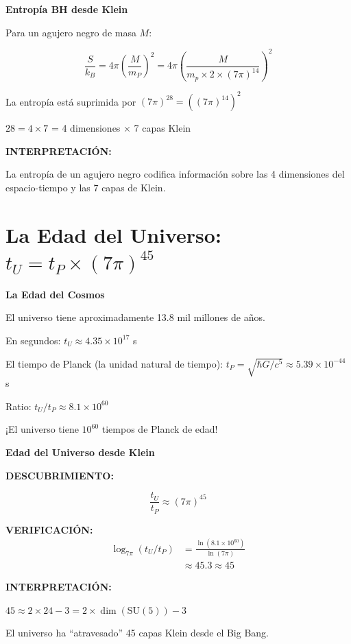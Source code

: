 \begin{nivelmatematico}
\textbf{Entropía BH desde Klein}

Para un agujero negro de masa $M$:

\begin{equation}
\frac{S}{k_B} = 4\pi \left(\frac{M}{m_P}\right)^2 = 4\pi \left(\frac{M}{m_p \times 2 \times (7\pi)^{14}}\right)^2
\end{equation}

La entropía está suprimida por $(7\pi)^{28} = ((7\pi)^{14})^2$

$28 = 4 \times 7$ = 4 dimensiones $\times$ 7 capas Klein

\textbf{INTERPRETACIÓN:}

La entropía de un agujero negro codifica información sobre
las 4 dimensiones del espacio-tiempo y las 7 capas de Klein.
\end{nivelmatematico}


\section{La Edad del Universo: $t_U = t_P \times (7\pi)^{45}$}

\begin{nivelconceptual}
\textbf{La Edad del Cosmos}

El universo tiene aproximadamente 13.8 mil millones de años.

En segundos: $t_U \approx 4.35 \times 10^{17}$ s

El tiempo de Planck (la unidad natural de tiempo):
$t_P = \sqrt{\hbar G/c^5} \approx 5.39 \times 10^{-44}$ s

Ratio: $t_U / t_P \approx 8.1 \times 10^{60}$

¡El universo tiene $10^{60}$ tiempos de Planck de edad!
\end{nivelconceptual}

\begin{nivelmatematico}
\textbf{Edad del Universo desde Klein}

\textbf{DESCUBRIMIENTO:}

\begin{equation}
\boxed{\frac{t_U}{t_P} \approx (7\pi)^{45}}
\end{equation}

\textbf{VERIFICACIÓN:}
\begin{align}
\log_{7\pi}(t_U/t_P) &= \frac{\ln(8.1 \times 10^{60})}{\ln(7\pi)}\\
&\approx 45.3 \approx 45
\end{align}

\textbf{INTERPRETACIÓN:}

$45 \approx 2 \times 24 - 3 = 2 \times \dim(\text{SU}(5)) - 3$

El universo ha ``atravesado'' 45 capas Klein desde el Big Bang.
\end{nivelmatematico}

